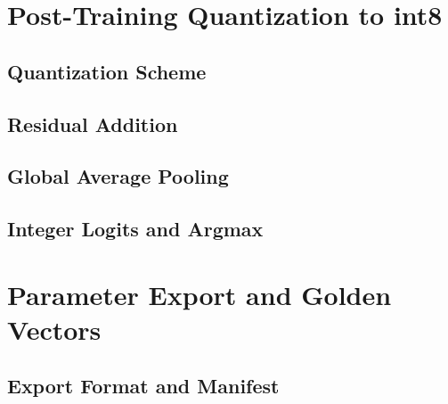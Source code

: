 \section{Post-Training Quantization to int8}
\label{sec:ptq}

\subsection{Quantization Scheme}
\label{sec:quant-scheme}

\subsection{Residual Addition}
\label{sec:residual-add}

\subsection{Global Average Pooling}
\label{sec:gap}

\subsection{Integer Logits and Argmax}
\label{sec:logits}

\section{Parameter Export and Golden Vectors}
\label{sec:export}

\subsection{Export Format and Manifest}
\label{sec:manifest}

